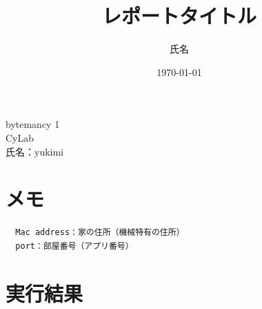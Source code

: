 \documentclass[a4paper,11pt,lualatex,ja=standard]{bxjsarticle}
\newcommand{\cover}[3]{
  \thispagestyle{empty}
  \vspace*{4cm}
  \begin{center}
    {\LARGE #1}\\[2cm]
    {\Large #2}\\[3cm]
    {\large 氏名：#3}\\[1cm]
  \end{center}
  \newpage
}
\begin{document}
\cover{bytemancy 1}{CyLab}{yukimi}

\title{レポートタイトル}
\author{氏名}
\date{\today}
\section{メモ}
\begin{verbatim}
  Mac address：家の住所（機械特有の住所）
  port：部屋番号（アプリ番号）
\end{verbatim}

\section{実行結果}
\begin{verbatim}

\end{verbatim}
\end{document}
